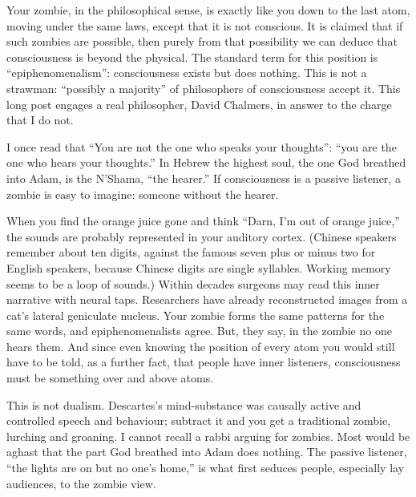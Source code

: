 
Your zombie, in the philosophical sense, is exactly like you down to the last atom, moving under the same laws, except that it is not conscious. It is claimed that if such zombies are possible, then purely from that possibility we can deduce that consciousness is beyond the physical. The standard term for this position is ``epiphenomenalism'': consciousness exists but does nothing.  This is not a strawman: ``possibly a majority'' of philosophers of consciousness accept it.  This long post engages a real philosopher, David Chalmers, in answer to the charge that I do not.

I once read that ``You are not the one who speaks your thoughts'': ``you are the one who hears your thoughts.'' In Hebrew the highest soul, the one God breathed into Adam, is the N'Shama, ``the hearer.'' If consciousness is a passive listener, a zombie is easy to imagine: someone without the hearer.

When you find the orange juice gone and think ``Darn, I'm out of orange juice,'' the sounds are probably represented in your auditory cortex. (Chinese speakers remember about ten digits, against the famous seven plus or minus two for English speakers, because Chinese digits are single syllables. Working memory seems to be a loop of sounds.) Within decades surgeons may read this inner narrative with neural taps. Researchers have already reconstructed images from a cat's lateral geniculate nucleus. Your zombie forms the same patterns for the same words, and epiphenomenalists agree. But, they say, in the zombie no one hears them. And since even knowing the position of every atom you would still have to be told, as a further fact, that people have inner listeners, consciousness must be something over and above atoms.

This is not dualism. Descartes's mind-substance was causally active and controlled speech and behaviour; subtract it and you get a traditional zombie, lurching and groaning. I cannot recall a rabbi arguing for zombies. Most would be aghast that the part God breathed into Adam does nothing. The passive listener, ``the lights are on but no one's home,'' is what first seduces people, especially lay audiences, to the zombie view.


